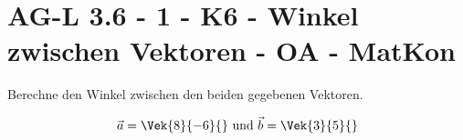 \section{AG-L 3.6 - 1 - K6 - Winkel zwischen Vektoren - OA - MatKon}

\begin{beispiel}[AG-L 3.6]{1}
Berechne den Winkel zwischen den beiden gegebenen Vektoren.

$$\vec{a}=\Vek{8}{-6}{}\text{ und }\vec{b}=\Vek{3}{5}{}$$

\end{beispiel}